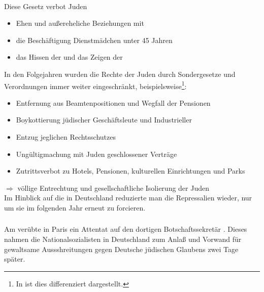 \paragraph{}
Diese Gesetz verbot Juden

\begin{itemize}
\item Ehen und außereheliche Beziehungen mit 
\item die Beschäftigung  Dienstmädchen unter 45
Jahren
\item das Hissen der  und das
Zeigen der 
\end{itemize}

In den Folgejahren wurden die Rechte der Juden durch Sondergesetze und
Verordnungen immer weiter eingeschränkt,
beispielsweise\footnote{In \cite[135-137]{GeschDrReich} ist dies
differenziert dargestellt.}:

\begin{itemize}
\item Entfernung aus Beamtenpositionen und Wegfall der Pensionen
\item Boykottierung jüdischer Geschäftsleute und Industrieller
\item Entzug jeglichen Rechtsschutzes
\item Ungültigmachung mit Juden geschlossener Verträge
\item Zutrittsverbot zu Hotels, Pensionen, kulturellen Einrichtungen
und Parks
\end{itemize}

\noindent $\Longrightarrow$ völlige Entrechtung und gesellschaftliche
Isolierung der Juden \\

Im Hinblick auf die  in Deutschland reduzierte
man die Repressalien  wieder, nur um sie im folgenden Jahr
erneut zu forcieren.


\subsubsection{}
\label{sss:pogromnacht}

Am  verübte  in Paris ein Attentat auf den dortigen Botschaftssekretär
.  Dieses nahmen die
Nationalsozialisten in Deutschland zum Anlaß und Vorwand für
gewaltsame Aussshreitungen gegen Deutsche jüdischen Glaubens zwei Tage
später.

